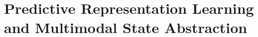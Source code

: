 \chapter{Predictive Representation Learning and Multimodal State Abstraction}
\label{ch:C05}










